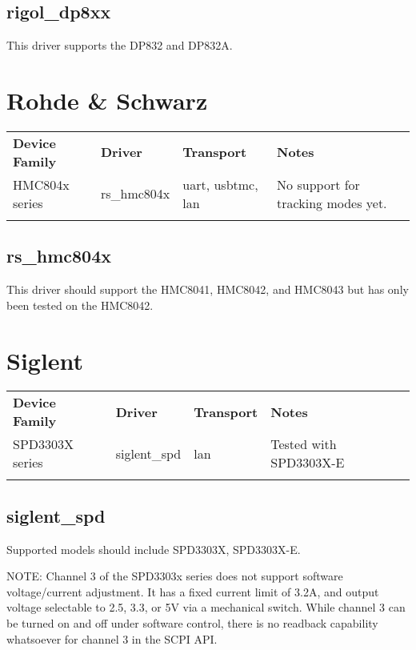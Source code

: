 \subsection{rigol\_dp8xx}

This driver supports the DP832 and DP832A.

\section{Rohde \& Schwarz}

\begin{tabularx}{16cm}{lllX}
\thickhline
\textbf{Device Family} & \textbf{Driver} & \textbf{Transport} & \textbf{Notes} \\
\thickhline
HMC804x series & rs\_hmc804x & uart, usbtmc, lan & No support for tracking modes yet.\\
\thickhline
\end{tabularx}

\subsection{rs\_hmc804x}

This driver should support the HMC8041, HMC8042, and HMC8043 but has only been tested on the HMC8042.

\section{Siglent}

\begin{tabularx}{16cm}{lllX}
\thickhline
\textbf{Device Family} & \textbf{Driver} & \textbf{Transport} & \textbf{Notes} \\
\thickhline
SPD3303X series & siglent\_spd & lan & Tested with SPD3303X-E\\
\thickhline
\end{tabularx}

\subsection{siglent\_spd}

Supported models should include SPD3303X, SPD3303X-E.

NOTE: Channel 3 of the SPD3303x series does not support software voltage/current adjustment. It has a fixed current
limit of 3.2A, and output voltage selectable to 2.5, 3.3, or 5V via a mechanical switch. While channel 3 can be turned
on and off under software control, there is no readback capability whatsoever for channel 3 in the SCPI API.

